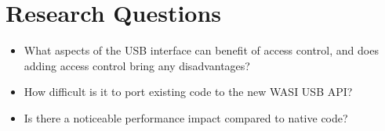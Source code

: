 \section*{Research Questions}

\begin{itemize}

\item What aspects of the USB interface can benefit of access control, and does adding access control bring any disadvantages?

\item How difficult is it to port existing code to the new WASI USB API?

\item Is there a noticeable performance impact compared to native code?

\end{itemize}
